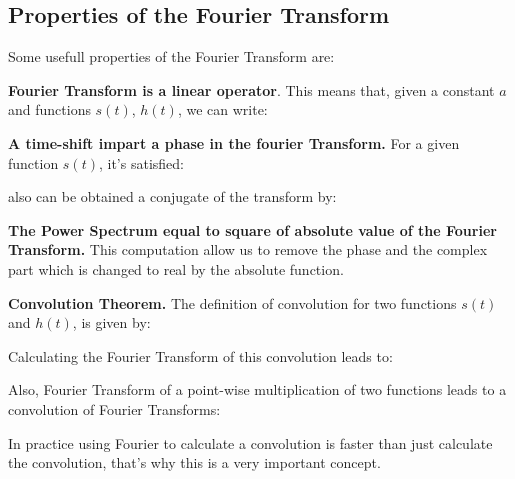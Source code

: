 \subsection{Properties of the Fourier Transform}{\label{sec:ft::subsec:propft}}
\newp Some usefull properties of the Fourier Transform are:
	\begin{description}
	
	\item \textbf{Fourier Transform is a linear operator}. This means that, given a constant $a$ and 		functions $s(t)$, $h(t)$, we can write:
	\insertequation[\label{propFT:linear1}]{\FF[s(t) + h(t)] =  \FF[s(t)] + \FF[h(t)]} 
	\insertequation[\label{propFT:linear2}]{\FF[as(t)] = a\FF[s(t)] }

	\item \textbf{A time-shift impart a phase in the fourier Transform.} For a given function $s(t)$, it's satisfied:
	
	\newp also can be obtained a conjugate of the transform by:
	

	\item \textbf{The Power Spectrum equal to square of absolute value of the Fourier Transform.} This computation allow us to remove the phase and the complex part which is changed to real by the absolute function.
	
	
	\item \textbf{Convolution Theorem.} The definition of convolution for two functions $s(t)$ and $h(t)$, is given by:
	
	
	Calculating the Fourier Transform of this convolution leads to:
	
	\insertequation[\label{convolution2}]{\FF[s * h] = \FF[s] \cdotp \FF[h]}
	
	Also, Fourier Transform of a point-wise multiplication of two functions leads to a convolution of Fourier Transforms:
	
	\insertequation[\label{convolution3}]{\FF[s(t) \cdotp h(t)](f) = \FF[s](f) * \FF[h](f)}
	
	In practice using Fourier to calculate a convolution is faster than just calculate the convolution, that's why this is a very important concept.
	

\end{description}
